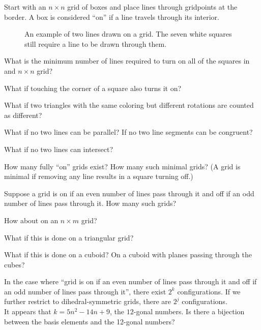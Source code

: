 \documentclass{article}
\begin{document}
Start with an $n \times n$ grid of boxes and place lines through gridpoints at
the border. A box is considered ``on'' if a line travels through its interior.
\begin{figure}[!h]
  \centering
  \caption{
    An example of two lines drawn on a grid. The seven white squares
    still require a line to be drawn through them.
  }
\end{figure}

\begin{question}
  What is the minimum number of lines required to turn on all of the squares in
  and $n\times n$ grid?
\end{question}
\begin{related}
  \item What if touching the corner of a square also turns it on?
  \item What if two triangles with the same coloring but different rotations are
    counted as different?
  \item What if no two lines can be parallel?
    If no two line segments can be congruent?
  \item What if no two lines can intersect?
  \item How many fully ``on'' grids exist? How many such minimal grids? (A grid is
    minimal if removing any line results in a square turning off.)
  \item Suppose a grid is on if an even number of lines pass through it and off
    if an odd number of lines pass through it. How many such grids?
  \item How about on an $n \times m$ grid?
  \item What if this is done on a triangular grid?
  \item What if this is done on a cuboid? On a cuboid with planes passing
    through the cubes?
\end{related}
\begin{note}
  In the case where ``grid is on if an even number of lines pass through it and
  off if an odd number of lines pass through it'', there exist $2^k$
  configurations. If we further restrict to dihedral-symmetric grids, there
  are $2^j$ configurations.\\
  It appears that $k = 5n^2 - 14n + 9$, the $12$-gonal numbers. Is there a
  bijection between the basis elements and the 12-gonal numbers?
\end{note}
\end{document}
